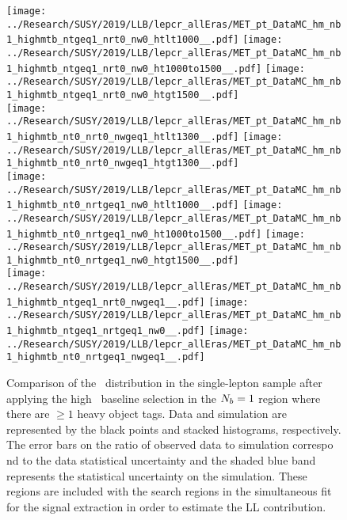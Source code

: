 \begin{figure}[!htb]
	\begin{center}
  \texttt{[image: ../Research/SUSY/2019/LLB/lepcr\_allEras/MET\_pt\_DataMC\_hm\_nb1\_highmtb\_ntgeq1\_nrt0\_nw0\_htlt1000\_\_.pdf]}
  \texttt{[image: ../Research/SUSY/2019/LLB/lepcr\_allEras/MET\_pt\_DataMC\_hm\_nb1\_highmtb\_ntgeq1\_nrt0\_nw0\_ht1000to1500\_\_.pdf]}
  \texttt{[image: ../Research/SUSY/2019/LLB/lepcr\_allEras/MET\_pt\_DataMC\_hm\_nb1\_highmtb\_ntgeq1\_nrt0\_nw0\_htgt1500\_\_.pdf]} \\
  \texttt{[image: ../Research/SUSY/2019/LLB/lepcr\_allEras/MET\_pt\_DataMC\_hm\_nb1\_highmtb\_nt0\_nrt0\_nwgeq1\_htlt1300\_\_.pdf]} 
  \texttt{[image: ../Research/SUSY/2019/LLB/lepcr\_allEras/MET\_pt\_DataMC\_hm\_nb1\_highmtb\_nt0\_nrt0\_nwgeq1\_htgt1300\_\_.pdf]} \\
  \texttt{[image: ../Research/SUSY/2019/LLB/lepcr\_allEras/MET\_pt\_DataMC\_hm\_nb1\_highmtb\_nt0\_nrtgeq1\_nw0\_htlt1000\_\_.pdf]} 
  \texttt{[image: ../Research/SUSY/2019/LLB/lepcr\_allEras/MET\_pt\_DataMC\_hm\_nb1\_highmtb\_nt0\_nrtgeq1\_nw0\_ht1000to1500\_\_.pdf]} 
  \texttt{[image: ../Research/SUSY/2019/LLB/lepcr\_allEras/MET\_pt\_DataMC\_hm\_nb1\_highmtb\_nt0\_nrtgeq1\_nw0\_htgt1500\_\_.pdf]} \\
  \texttt{[image: ../Research/SUSY/2019/LLB/lepcr\_allEras/MET\_pt\_DataMC\_hm\_nb1\_highmtb\_ntgeq1\_nrt0\_nwgeq1\_\_.pdf]} 
  \texttt{[image: ../Research/SUSY/2019/LLB/lepcr\_allEras/MET\_pt\_DataMC\_hm\_nb1\_highmtb\_ntgeq1\_nrtgeq1\_nw0\_\_.pdf]} 
  \texttt{[image: ../Research/SUSY/2019/LLB/lepcr\_allEras/MET\_pt\_DataMC\_hm\_nb1\_highmtb\_nt0\_nrtgeq1\_nwgeq1\_\_.pdf]} \\
	\end{center}
	\caption{Comparison of the \met~distribution in the single-lepton sample after applying the high \dm~baseline selection in the $N_{b}=1$ region where there are $\geq1$ heavy object tags. Data and simulation are represented by the black points and stacked histograms, respectively. The error bars on the ratio of observed data to simulation correspo    nd to the data statistical uncertainty and the shaded blue band represents the statistical uncertainty on the simulation. These regions are included with the search regions in the simultaneous fit for the signal extraction in order to estimate the LL contribution.
	 }
	\label{fig:llb-1lcr-datavsmc-hm-nb1}
\end{figure}

